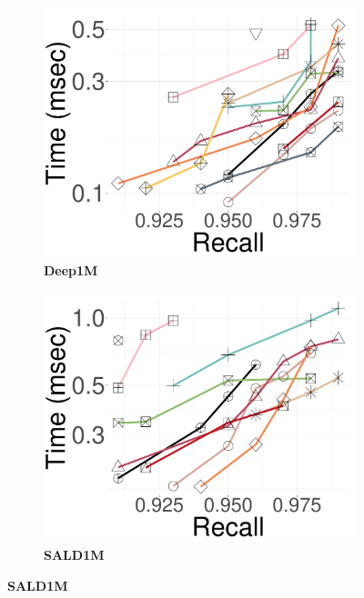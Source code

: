 \begin{figure}[!htb]
\begin{subfigure}{\soneM\textwidth}
 \label{fig:elpis:query:performance:1M:sift:10NN}
	\end{subfigure}
   \hspace{0.4cm}
	\begin{subfigure}{\soneM\textwidth}
		\centering
		\includegraphics[width=\textwidth]{../img/Experiments/search/1M/deep_10nn.pdf}
		\caption{\textbf{Deep1M}} 
		\label{fig:elpis:query:performance:1M:deep:10NN}
	\end{subfigure}
   \hspace{0.4cm}
	\begin{subfigure}{\soneM\textwidth}
		\centering
		\includegraphics[width=\textwidth]{../img/Experiments/search/1M/sald_10nn.pdf}
		\caption{\textbf{SALD1M}} 
		\label{fig:elpis:query:performance:1M:sald:10NN}
	\end{subfigure}
 

\end{figure}
